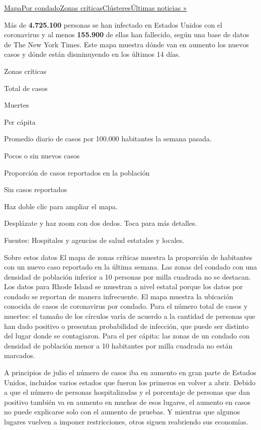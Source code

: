 \protect\hyperlink{map}{Mapa}\protect\hyperlink{states}{Por
condado}\protect\hyperlink{hotspots}{Zonas
críticas}\protect\hyperlink{clusters}{Clústeres}\href{https://www.nytimes.com/2020/08/04/world/coronavirus-covid-19.html}{Últimas
noticias »}

Más de \textbf{4.725.100} personas se han infectado en Estados Unidos
con el coronavirus y al menos \textbf{155.900} de ellas han fallecido,
según una base de datos de The New York Times. Este mapa muestra dónde
van en aumento los nuevos casos y dónde están disminuyendo en los
últimos 14 días.

Zonas críticas

Total de casos

Muertes

Per cápita

Promedio diario de casos por 100.000 habitantes la semana pasada.

Pocos o sin nuevos casos

Proporción de casos reportados en la población

Sin casos reportados

Haz doble clic para ampliar el mapa.

Desplázate y haz zoom con dos dedos. Toca para más detalles.

Fuentes: Hospitales y agencias de salud estatales y locales.

Sobre estos datos El mapa de zonas críticas muestra la proporción de
habitantes con un nuevo caso reportado en la última semana. Las zonas
del condado con una densidad de población inferior a 10 personas por
milla cuadrada no se destacan. Los datos para Rhode Island se muestran a
nivel estatal porque los datos por condado se reportan de manera
infrecuente. El mapa muestra la ubicación conocida de casos de
coronavirus por condado. Para el número total de casos y muertes: el
tamaño de los círculos varía de acuerdo a la cantidad de personas que
han dado positivo o presentan probabilidad de infección, que puede ser
distinto del lugar donde se contagiaron. Para el per cápita: las zonas
de un condado con densidad de población menor a 10 habitantes por milla
cuadrada no están marcados.

A principios de julio el número de casos iba en aumento en gran parte de
Estados Unidos, incluidos varios estados que fueron los primeros en
volver a abrir. Debido a que el número de personas hospitalizadas y el
porcentaje de personas que dan positivo también va en aumento en muchos
de esos lugares, el aumento en casos no puede explicarse solo con el
aumento de pruebas. Y mientras que algunos lugares vuelven a imponer
restricciones, otros siguen reabriendo sus economías.

